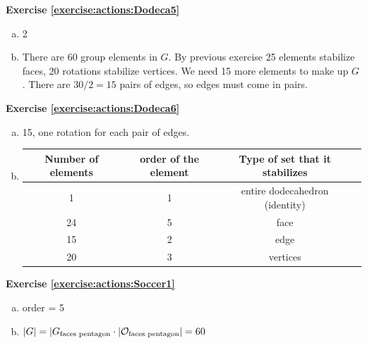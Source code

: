 \noindent\textbf{Exercise \ref{exercise:actions:Dodeca5}}
\begin{enumerate}[(a)]
\item
2

\item 
There are 60 group elements in $G$.  By previous exercise 25 elements stabilize faces, 20 rotations stabilize vertices. We need 15 more elements to make up $G$.  There are $30/2=15$ pairs of edges, so edges must come in pairs.
\end{enumerate}

\noindent\textbf{Exercise \ref{exercise:actions:Dodeca6}}
\begin{enumerate}[(a)]
\item
15, one rotation for each pair of edges.

\item
\begin{tabular}{| c |c|c| r |}\hline
Number of elements & order of the element & Type of set that it stabilizes \\ \hline
1 & 1 & entire dodecahedron (identity) \\ \hline
24 & 5 & face \\ \hline
15 & 2 & edge\\ \hline
20 & 3  & vertices\\ \hline
\end{tabular}
\end{enumerate}

\noindent\textbf{Exercise \ref{exercise:actions:Soccer1}}
\begin{enumerate}[(a)]
\item
order = 5
\item
$|G| = |G_{\text{faces pentagon}} \cdot |{\cal O}_{\text{faces pentagon}}| = 60$
\end{enumerate}

